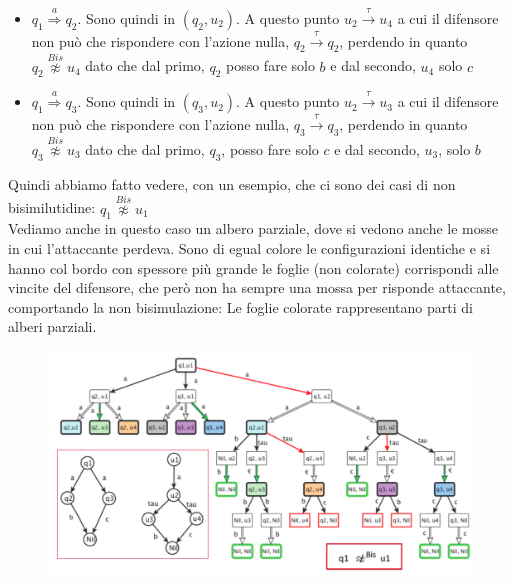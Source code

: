\begin{itemize}
    \item $q_1\stackrel{a}{\Rightarrow}q_2$. Sono quindi in $(q_2,u_2)$. A questo punto $u_2\stackrel{\tau}{\rightarrow}u_4$ a cui il difensore non può che rispondere con l’azione nulla, $q_2\stackrel{\tau}{\rightarrow}q_2$, perdendo in quanto $q_2\stackrel{Bis}{\not\approx} u_4$ dato che dal primo, $q_2$ posso fare solo $b$ e dal secondo, $u_4$ solo $c$
    \item $q_1\stackrel{a}{\Rightarrow}q_3$. Sono quindi in $(q_3,u_2)$. A questo punto $u_2\stackrel{\tau}{\rightarrow}u_3$ a cui il difensore non può che rispondere con l’azione nulla, $q_3\stackrel{\tau}{\rightarrow}q_3$, perdendo in quanto $q_3\stackrel{Bis}{\not\approx} u_3$ dato che dal primo, $q_3$, posso fare solo $c$ e dal secondo, $u_3$, solo $b$
  \end{itemize}
Quindi abbiamo fatto vedere, con un esempio, che ci sono dei casi di non bisimilutidine: $q_1\stackrel{Bis}{\not\approx} u_1$\\
Vediamo anche in questo caso un albero parziale, dove si vedono anche le mosse in cui l'attaccante perdeva. Sono di egual colore le configurazioni identiche e si hanno col bordo con spessore più grande le foglie (non colorate) corrispondi alle vincite del difensore, che però non ha sempre una mossa per risponde attaccante, comportando la non bisimulazione:
Le foglie colorate rappresentano parti di alberi parziali.
\begin{figure}[H]
    \centering
    \includegraphics[scale = 0.4]{IMM/albero_grosso.PNG}
\end{figure}